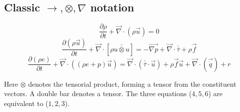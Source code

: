 \subsection{Classic $\longrightarrow , \otimes , \nabla$ notation}
\begin{equation}
\frac{\partial \rho}{\partial t} + \overrightarrow{\nabla}\cdot(\rho\overrightarrow{u})=0 \end{equation}
\begin{equation}
\frac{\partial(\rho \overrightarrow{u})}{\partial t} + \overrightarrow{\nabla}\cdot[\rho\overline{\overline{u\otimes u}}] = -\overrightarrow{\nabla p} + \overrightarrow{\nabla}\cdot\overline{\overline{\tau}} + \rho\overrightarrow{f} \end{equation}
\begin{equation}
\frac{\partial(\rho e)}{\partial t} + \overrightarrow{\nabla}\cdot((\rho e + p)\overrightarrow{u}) = \overrightarrow{\nabla}\cdot(\overline{\overline{\tau}}\cdot\overrightarrow{u}) + \rho\overrightarrow{f}\overrightarrow{u} + \overrightarrow{\nabla}\cdot(\overrightarrow{\dot{q}})+r \end{equation}

Here $\otimes$ denotes the tensorial product, forming a tensor from the constituent vectors. A double bar denotes a tensor. The three equations ($4,5,6$) are equivalent to ($1,2,3$).
